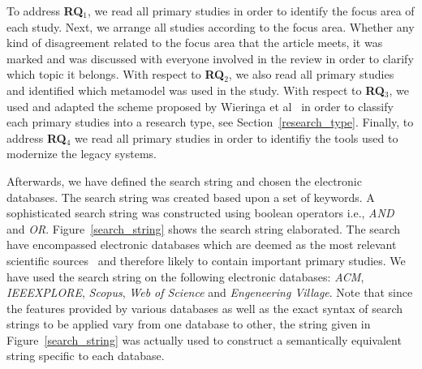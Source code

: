 


To address \textbf{RQ$_1$}, we read all primary studies in order to identify the focus area of each study. Next, we arrange all studies according to the focus area. Whether any kind of disagreement related to the focus area that the article meets, it was marked and was discussed with everyone involved in the review in order to clarify which topic it belongs. With respect to \textbf{RQ$_2$}, we also read all primary studies and identified which metamodel was used in the study. With respect to \textbf{RQ$_3$}, we used and adapted the scheme proposed by Wieringa et al~\cite{Wieringa:2005:REP:1107677.1107683} in order to classify each primary studies into a research type, see Section~\ref{research_type}. Finally, to address \textbf{RQ$_4$} we read all primary studies in order to identifiy the tools used to modernize the legacy systems. %


Afterwards, we have defined the search string and chosen the electronic databases. The search string was created based upon a set of keywords. A sophisticated search string was constructed using boolean operators i.e., \textit{AND} and \textit{OR}. Figure~\ref{search_string} shows the search string elaborated. The search have encompassed electronic databases which are deemed as the most relevant scientific sources~\cite{Dyba} and therefore likely to contain important primary studies. We have used the search string on the following electronic databases: \textit{ACM}, \textit{IEEEXPLORE}, \textit{Scopus}, \textit{Web of Science} and \textit{Engeneering Village}. Note that since the features provided by various databases as well as the exact syntax of search strings to be applied vary from one database to other, the string given in Figure~\ref{search_string} was actually used to construct a semantically equivalent string specific to each database.


